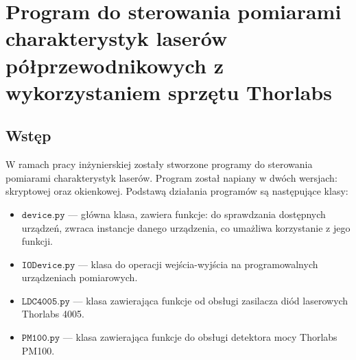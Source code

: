 \chapter{Program do sterowania pomiarami charakterystyk laserów półprzewodnikowych z wykorzystaniem sprzętu Thorlabs}
\section{Wstęp}
W ramach pracy inżynierskiej zostały stworzone programy do sterowania pomiarami charakterystyk laserów.
Program został napiany w dwóch wersjach: skryptowej oraz okienkowej. Podstawą działania programów są następujące klasy:
\begin{itemize}
\item $\mathtt{device.py}$ --- główna klasa, zawiera funkcje: do sprawdzania dostępnych urządzeń,
zwraca instancje danego urządzenia, co umażliwa korzystanie z jego funkcji.
\item $\mathtt{IODevice.py}$ --- klasa do operacji wejścia-wyjścia na programowalnych urządzeniach pomiarowych.
\item $\mathtt{LDC4005.py}$ --- klasa zawierająca funkcje od obsługi zasilacza diód laserowych Thorlabs 4005.
\item $\mathtt{PM100.py}$ --- klasa zawierająca funkcje do obsługi detektora mocy Thorlabs PM100.
\end{itemize}
